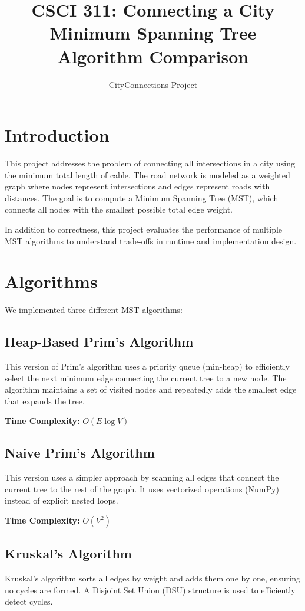 \documentclass[11pt]{article}
\title{CSCI 311: Connecting a City\\
Minimum Spanning Tree Algorithm Comparison}
\author{CityConnections Project}
\date{}
\begin{document}
\maketitle

\section{Introduction}

This project addresses the problem of connecting all intersections in a city using the minimum total length of cable. The road network is modeled as a weighted graph where nodes represent intersections and edges represent roads with distances. The goal is to compute a Minimum Spanning Tree (MST), which connects all nodes with the smallest possible total edge weight.

In addition to correctness, this project evaluates the performance of multiple MST algorithms to understand trade-offs in runtime and implementation design.

\section{Algorithms}

We implemented three different MST algorithms:

\subsection{Heap-Based Prim’s Algorithm}
This version of Prim’s algorithm uses a priority queue (min-heap) to efficiently select the next minimum edge connecting the current tree to a new node. The algorithm maintains a set of visited nodes and repeatedly adds the smallest edge that expands the tree.

\textbf{Time Complexity:} $O(E \log V)$

\subsection{Naive Prim’s Algorithm}
This version uses a simpler approach by scanning all edges that connect the current tree to the rest of the graph. It uses vectorized operations (NumPy) instead of explicit nested loops.

\textbf{Time Complexity:} $O(V^2)$

\subsection{Kruskal’s Algorithm}
Kruskal’s algorithm sorts all edges by weight and adds them one by one, ensuring no cycles are formed. A Disjoint Set Union (DSU) structure is used to efficiently detect cycles.
\end{document}
